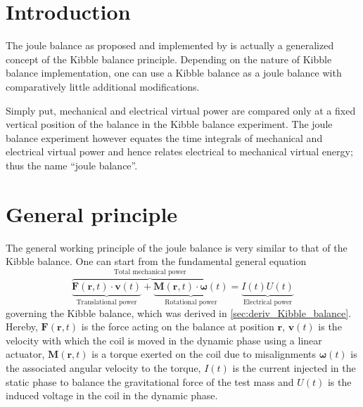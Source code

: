 \documentclass{report}
\numberwithin{tm}{section}
\newcommand\vect[1]{\ensuremath{\bm{#1}}}
\begin{document}
\section{Introduction}
The joule balance as proposed and implemented by \cite{Xu_2016} is actually a generalized concept of the Kibble balance principle. Depending on the nature of Kibble balance implementation, one can use a Kibble balance as a joule balance with comparatively little additional modifications. 

Simply put, mechanical and electrical virtual power are compared only at a fixed vertical position of the balance in the Kibble balance experiment. The joule balance experiment however equates the time integrals of mechanical and electrical virtual power and hence relates electrical to mechanical virtual energy; thus the name ``joule balance''.


\section{General principle}
The general working principle of the joule balance is very similar to that of the Kibble balance. One can start from the fundamental general equation 
\begin{equation}\label{eq:joulebalancestart}
	\overbrace{\underbrace{\vect{F}(\vect{r},t)\cdot \vect{v}(t)}_{\text{Translational power}} + \underbrace{\vect{M}(\vect{r},t)\cdot \vect{\omega}(t)}_{\text{Rotational power}}}^\text{Total mechanical power} = \underbrace{I(t) U(t)}_{\text{Electrical power}}
\end{equation}
governing the Kibble balance, which was derived in \cref{sec:deriv_Kibble_balance}. Hereby, $\vect{F}(\vect{r},t)$ is the force acting on the balance at position $\vect{r}$, $\vect{v}(t)$ is the velocity with which the coil is moved in the dynamic phase using a linear actuator, $\vect{M}(\vect{r},t)$ is a torque exerted on the coil due to misalignments $\vect{\omega}(t)$ is the associated angular velocity to the torque, $I(t)$ is the current injected in the static phase to balance the gravitational force of the test mass and $U(t)$ is the induced voltage in the coil in the dynamic phase.
\end{document}
